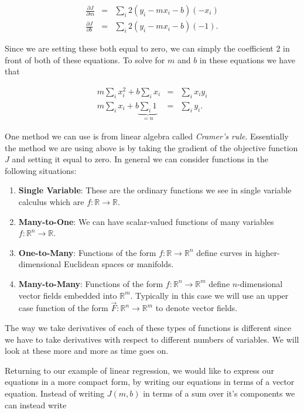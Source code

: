 \documentclass{article}
\begin{document}
\begin{eqnarray*}
\frac{\partial J}{\partial m} & = & \sum_i 2(y_i - mx_i - b)(-x_i) \\
\frac{\partial J}{\partial b} & = & \sum_i 2(y_i - mx_i - b)(-1).
\end{eqnarray*}

\noindent Since we are setting these both equal to zero, we can simply the coefficient $2$ in front of both of these equations.  To solve for $m$ and $b$ in these equations we have that 

\begin{eqnarray*}
m \sum_i x_i^2 + b\sum_i x_i & = & \sum_i x_iy_i \\
m \sum_i x_i + b\underbrace{\sum_i 1}_{=n} & = & \sum_i y_i.
\end{eqnarray*}

\noindent One method we can use is from linear algebra called {\em Cramer's rule}.  Essentially the method we are using above is by taking the gradient of the objective function $J$ and setting it equal to zero.  In general we can consider functions in the following situations:

\begin{enumerate}
\item \textbf{Single Variable}: These are the ordinary functions we see in single variable calculus which are $f:\mathbb{R} \to \mathbb{R}$.
\item \textbf{Many-to-One}: We can have scalar-valued functions of many variables $f:\mathbb{R}^n \to \mathbb{R}$.
\item \textbf{One-to-Many}: Functions of the form $f:\mathbb{R} \to \mathbb{R}^n$ define curves in higher-dimensional Euclidean spaces or manifolds.
\item \textbf{Many-to-Many}: Functions of the form $f:\mathbb{R}^n \to \mathbb{R}^m$ define $n$-dimensional vector fields embedded into $\mathbb{R}^m$.  Typically in this case we will use an upper case function of the form $\vec{F}:\mathbb{R}^n \to \mathbb{R}^m$ to denote vector fields.
\end{enumerate}

\noindent The way we take derivatives of each of these types of functions is different since we have to take derivatives with respect to different numbers of variables.  We will look at these more and more as time goes on.  

\vspace{1pc}

\noindent Returning to our example of linear regression, we would like to express our equations in a more compact form, by writing our equations in terms of a vector equation.  Instead of writing $J(m,b)$ in terms of a sum over it's components we can instead write
\end{document}
